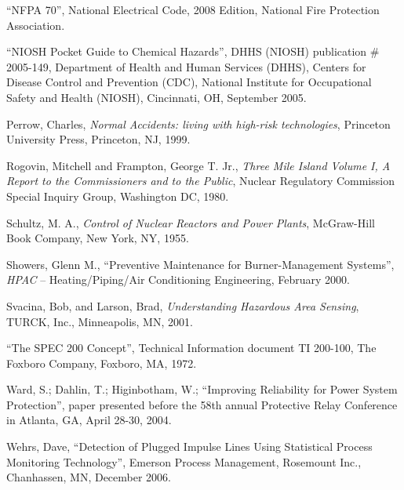 \noindent
``NFPA 70'', National Electrical Code, 2008 Edition, National Fire Protection Association.

\vskip 10pt

\noindent
``NIOSH Pocket Guide to Chemical Hazards'', DHHS (NIOSH) publication \# 2005-149, Department of Health and Human Services (DHHS), Centers for Disease Control and Prevention (CDC), National Institute for Occupational Safety and Health (NIOSH), Cincinnati, OH, September 2005.

\vskip 10pt

\noindent
Perrow, Charles, \textit{Normal Accidents: living with high-risk technologies}, Princeton University Press, Princeton, NJ, 1999.

\vskip 10pt

\noindent
Rogovin, Mitchell and Frampton, George T. Jr., \textit{Three Mile Island Volume I, A Report to the Commissioners and to the Public}, Nuclear Regulatory Commission Special Inquiry Group, Washington DC, 1980.

\vskip 10pt

\noindent
Schultz, M. A., \textit{Control of Nuclear Reactors and Power Plants}, McGraw-Hill Book Company, New York, NY, 1955.

\vskip 10pt

\noindent
Showers, Glenn M., ``Preventive Maintenance for Burner-Management Systems'', \textit{HPAC} -- Heating/Piping/Air Conditioning Engineering, February 2000.

\vskip 10pt

\noindent
Svacina, Bob, and Larson, Brad, \textit{Understanding Hazardous Area Sensing}, TURCK, Inc., Minneapolis, MN, 2001.

\vskip 10pt

\noindent
``The SPEC 200 Concept'', Technical Information document TI 200-100, The Foxboro Company, Foxboro, MA, 1972.

\vskip 10pt

\noindent
Ward, S.; Dahlin, T.; Higinbotham, W.; ``Improving Reliability for Power System Protection'', paper presented before the 58th annual Protective Relay Conference in Atlanta, GA, April 28-30, 2004.

\vskip 10pt

\noindent
Wehrs, Dave, ``Detection of Plugged Impulse Lines Using Statistical Process Monitoring Technology'', Emerson Process Management, Rosemount Inc., Chanhassen, MN, December 2006.




















